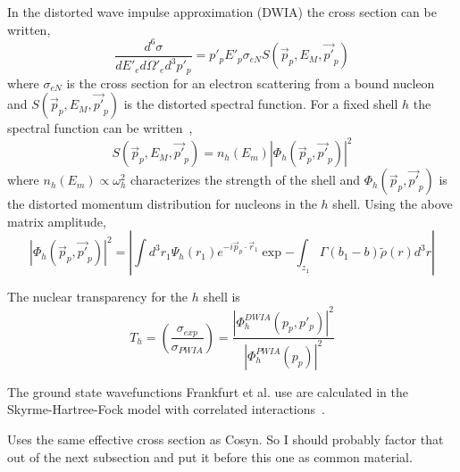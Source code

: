 In the distorted wave impulse approximation (DWIA) the cross section can be
written,
\begin{equation}
    \frac{d^6\sigma}{dE'_{e} d\Omega'_{e} d^3p'_{p}} = p'_p E'_p \sigma_{eN} S(\vec{p}_p, E_M, \vec{p'}_p)
\end{equation}
where $\sigma_{eN}$ is the cross section for an electron scattering from a
bound nucleon and $S(\vec{p}_p, E_M, \vec{p'}_p)$ is the distorted
spectral function.
For a fixed shell $h$ the spectral function can be written~\cite{Frullani_1984},
\begin{equation}
    S(\vec{p}_p, E_M, \vec{p'}_p) = n_h(E_m) |\Phi_h(\vec{p}_p, \vec{p'}_p)|^2
\end{equation}
where $n_h(E_m)\propto\omega_h^2$ characterizes the strength of the shell and
$\Phi_h(\vec{p}_p, \vec{p'}_p)$ is the distorted momentum distribution for
nucleons in the $h$ shell.
Using the above matrix amplitude,
\begin{equation}
    \left| \Phi_h(\vec{p}_p, \vec{p'}_p)\right|^2
        = \left|
            \int d^3 r_1 \Psi_h(r_1) e^{-i \vec{p}_p \cdot \vec{r}_1}
            \exp{- \int_{z_{1}} \Gamma\left(b_{1}-b\right) \tilde{\rho}(r) d^3 r}
          \right|
\end{equation}

The nuclear transparency for the $h$ shell is
\begin{equation}
    T_h = \left(\frac{\sigma_{exp}}{\sigma_{PWIA}}\right)
        = \frac{|\Phi^{DWIA}_h(p_p,p'_p)|^2}
               {|\Phi^{PWIA}_h(p_p)|^2}
\end{equation}

The ground state wavefunctions Frankfurt et al. use are calculated in the
Skyrme-Hartree-Fock model with correlated interactions~\cite{Reinhard_1991}.

Uses the same effective cross section as Cosyn. So I should probably factor
that out of the next subsection and put it before this one as common material.

